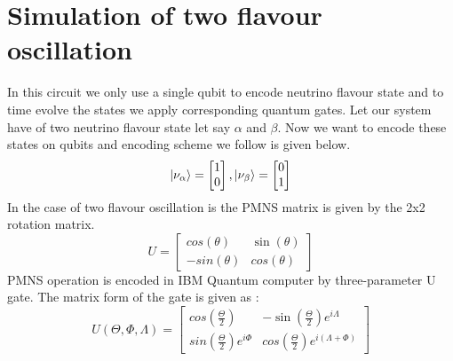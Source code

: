 \documentclass[12pt,a4paper]{report}
\begin{document}
\section{Simulation of two flavour oscillation}\label{2FO}
In this circuit we only use a single qubit to encode neutrino flavour state and to time evolve the states we apply corresponding quantum gates. Let our system have of two neutrino flavour state let say $\alpha$ and $\beta$. Now we want to encode these states on qubits and encoding scheme we follow is given below.
\begin{equation}
\begin{split} 
\label{eq:14}
\ket{\nu_{\alpha}}=\begin{bmatrix} 1 \\ 0 \end{bmatrix} , 
\ket{\nu_{\beta}}=\begin{bmatrix} 0 \\ 1 \end{bmatrix}
\end{split}
\end{equation}
In the case of two flavour oscillation is the PMNS matrix is given by the 2x2 rotation matrix.
\begin{equation}
U=\begin{bmatrix} cos(\theta) & \sin(\theta) \\ -sin(\theta) & 
cos(\theta) \end{bmatrix}
\end{equation}
PMNS operation is encoded in  IBM Quantum computer by three-parameter U gate. The matrix form of the gate is given as :
\begin{equation}
	\label{eq:15}
	U (\Theta,\Phi,\Lambda) =\begin{bmatrix} cos(\frac{\Theta}{2}) & -\sin(\frac{\Theta}{2})e^{i\Lambda} \\ sin(\frac{\Theta}{2})e^{i\Phi} & 
		cos(\frac{\Theta}{2})e^{i(\Lambda + \Phi)} \end{bmatrix}
\end{equation}
\end{document}

